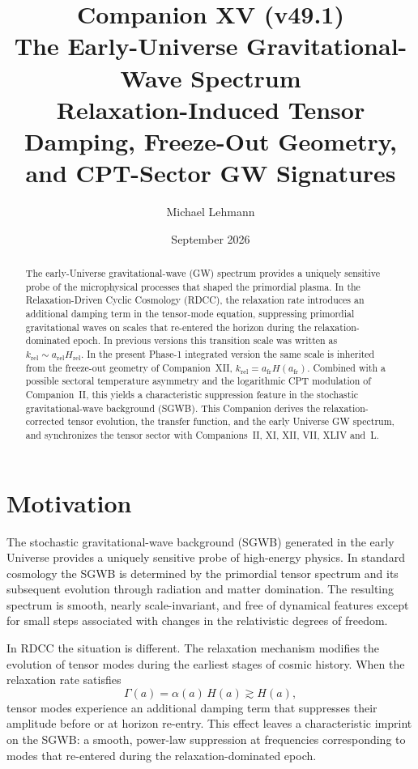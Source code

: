 \documentclass[11pt,a4paper]{article}
\title{\textbf{Companion XV (v49.1)}\\[0.2cm]
\textbf{The Early-Universe Gravitational-Wave Spectrum}\\[0.15cm]
\large Relaxation-Induced Tensor Damping, Freeze-Out Geometry,
and CPT-Sector GW Signatures}
\author[1]{Michael Lehmann}
\affil[1]{\small Independent Researcher, Relaxation-Driven Cyclic Cosmology (RDCC)\\
\texttt{mi.lehmann@gmx.de}}
\date{September 2026}
\begin{document}
\maketitle

\begin{abstract}
The early-Universe gravitational-wave (GW) spectrum provides a uniquely
sensitive probe of the microphysical processes that shaped the primordial
plasma. In the Relaxation-Driven Cyclic Cosmology (RDCC), the relaxation
rate introduces an additional damping term in the tensor-mode equation,
suppressing primordial gravitational waves on scales that re-entered the
horizon during the relaxation-dominated epoch. In previous versions this
transition scale was written as \(k_{\mathrm{rel}}\sim a_{\mathrm{rel}}
H_{\mathrm{rel}}\). In the present Phase-1 integrated version the same
scale is inherited from the freeze-out geometry of Companion~XII,
\(k_{\mathrm{rel}}=a_{\mathrm{fr}}H(a_{\mathrm{fr}})\). Combined with a
possible sectoral temperature asymmetry and the logarithmic CPT modulation
of Companion~II, this yields a characteristic suppression feature in the
stochastic gravitational-wave background (SGWB). This Companion derives the
relaxation-corrected tensor evolution, the transfer function, and the early
Universe GW spectrum, and synchronizes the tensor sector with Companions~II,
XI, XII, VII, XLIV and~L.
\end{abstract}

\tableofcontents
\newpage

\section{Motivation}

The stochastic gravitational-wave background (SGWB) generated in the early
Universe provides a uniquely sensitive probe of high-energy physics. In
standard cosmology the SGWB is determined by the primordial tensor spectrum
and its subsequent evolution through radiation and matter domination. The
resulting spectrum is smooth, nearly scale-invariant, and free of dynamical
features except for small steps associated with changes in the relativistic
degrees of freedom.

In RDCC the situation is different. The relaxation mechanism modifies the
evolution of tensor modes during the earliest stages of cosmic history.
When the relaxation rate satisfies
\begin{equation}
  \Gamma(a)
  =
  \alpha(a)\, H(a)
  \gtrsim
  H(a),
\end{equation}
tensor modes experience an additional damping term that suppresses their
amplitude before or at horizon re-entry. This effect leaves a characteristic
imprint on the SGWB: a smooth, power-law suppression at frequencies
corresponding to modes that re-entered during the relaxation-dominated
epoch.
\end{document}
